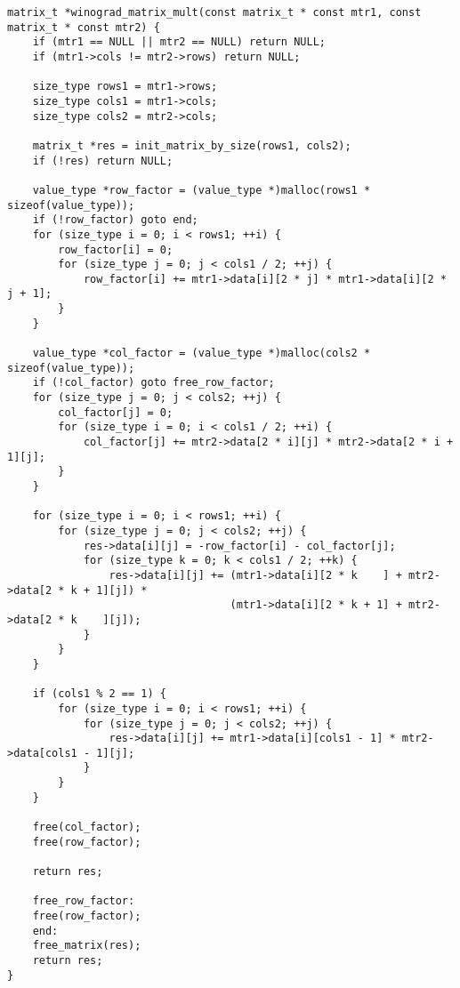 \begin{center}
\captionsetup{justification=raggedright,singlelinecheck=off}
\begin{lstlisting}[label=lst:win,caption=Алгоритм Винограда]
matrix_t *winograd_matrix_mult(const matrix_t * const mtr1, const matrix_t * const mtr2) {
    if (mtr1 == NULL || mtr2 == NULL) return NULL;
    if (mtr1->cols != mtr2->rows) return NULL;

    size_type rows1 = mtr1->rows;
    size_type cols1 = mtr1->cols;
    size_type cols2 = mtr2->cols;

    matrix_t *res = init_matrix_by_size(rows1, cols2);
    if (!res) return NULL;

    value_type *row_factor = (value_type *)malloc(rows1 * sizeof(value_type));
    if (!row_factor) goto end;
    for (size_type i = 0; i < rows1; ++i) {
        row_factor[i] = 0;
        for (size_type j = 0; j < cols1 / 2; ++j) {
            row_factor[i] += mtr1->data[i][2 * j] * mtr1->data[i][2 * j + 1];
        }
    }

    value_type *col_factor = (value_type *)malloc(cols2 * sizeof(value_type));
    if (!col_factor) goto free_row_factor;
    for (size_type j = 0; j < cols2; ++j) {
        col_factor[j] = 0;
        for (size_type i = 0; i < cols1 / 2; ++i) {
            col_factor[j] += mtr2->data[2 * i][j] * mtr2->data[2 * i + 1][j];
        }
    }

    for (size_type i = 0; i < rows1; ++i) {
        for (size_type j = 0; j < cols2; ++j) {
            res->data[i][j] = -row_factor[i] - col_factor[j];
            for (size_type k = 0; k < cols1 / 2; ++k) {
                res->data[i][j] += (mtr1->data[i][2 * k    ] + mtr2->data[2 * k + 1][j]) *
                                   (mtr1->data[i][2 * k + 1] + mtr2->data[2 * k    ][j]);
            }
        }
    }

    if (cols1 % 2 == 1) {
        for (size_type i = 0; i < rows1; ++i) {
            for (size_type j = 0; j < cols2; ++j) {
                res->data[i][j] += mtr1->data[i][cols1 - 1] * mtr2->data[cols1 - 1][j];
            }
        }
    }

    free(col_factor);
    free(row_factor);
    
    return res;

    free_row_factor:
    free(row_factor);
    end:
    free_matrix(res);
    return res;
}
\end{lstlisting}
\end{center}

